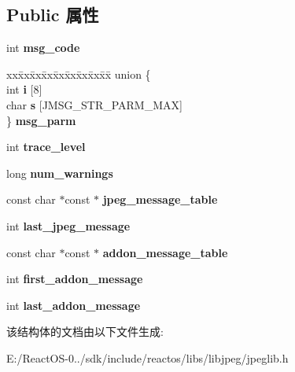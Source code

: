 \subsection*{Public 属性}
\begin{DoxyCompactItemize}
\item 
\mbox{\label{structjpeg__error__mgr_a27fcf9391530acf9075836c5d11fff00}} 
int {\bfseries msg\+\_\+code}
\item 
\mbox{\label{structjpeg__error__mgr_a05f867af15e5e3e1e2ace651745efced}} 
\begin{tabbing}
xx\=xx\=xx\=xx\=xx\=xx\=xx\=xx\=xx\=\kill
union \{\\
\>int {\bfseries i} \mbox{[}8\mbox{]}\\
\>char {\bfseries s} \mbox{[}JMSG\_STR\_PARM\_MAX\mbox{]}\\
\} {\bfseries msg\_parm}\\

\end{tabbing}\item 
\mbox{\label{structjpeg__error__mgr_a77328bf266cc3c3c4d9741fc27a4ef9b}} 
int {\bfseries trace\+\_\+level}
\item 
\mbox{\label{structjpeg__error__mgr_a6d74f34ca06fd61c9cc2b5818d317255}} 
long {\bfseries num\+\_\+warnings}
\item 
\mbox{\label{structjpeg__error__mgr_aeaa5c5dc26052bd7e367ceb35f670beb}} 
const char $\ast$const  $\ast$ {\bfseries jpeg\+\_\+message\+\_\+table}
\item 
\mbox{\label{structjpeg__error__mgr_a01d4d8f17f2d2ad49e5bd981c01296b9}} 
int {\bfseries last\+\_\+jpeg\+\_\+message}
\item 
\mbox{\label{structjpeg__error__mgr_af327179ad6b8d663a173e25615257e33}} 
const char $\ast$const  $\ast$ {\bfseries addon\+\_\+message\+\_\+table}
\item 
\mbox{\label{structjpeg__error__mgr_a35a1536b1171bb13510b5156ffa0af05}} 
int {\bfseries first\+\_\+addon\+\_\+message}
\item 
\mbox{\label{structjpeg__error__mgr_a67531ea98e366e64d5b348446d50e806}} 
int {\bfseries last\+\_\+addon\+\_\+message}
\end{DoxyCompactItemize}


该结构体的文档由以下文件生成\+:\begin{DoxyCompactItemize}
\item 
E\+:/\+React\+O\+S-\/0../sdk/include/reactos/libs/libjpeg/jpeglib.\+h\end{DoxyCompactItemize}
